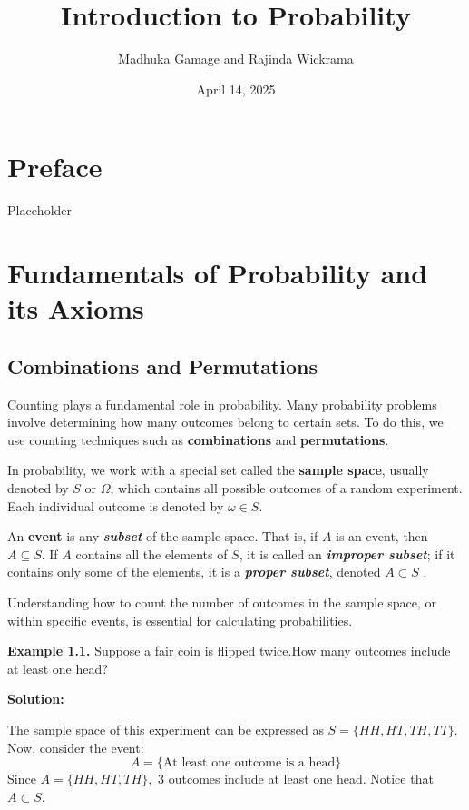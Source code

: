 \documentclass[
  12pt,
]{krantzNoCorner}
\title{Introduction to Probability}
\author{Madhuka Gamage and Rajinda Wickrama}
\date{April 14, 2025}
\begin{document}
\maketitle

{
\hypersetup{linkcolor=}
\setcounter{tocdepth}{2}
\tableofcontents
}
\hypertarget{preface}{%
\chapter*{Preface}\label{preface}}


Placeholder

\hypertarget{fundamentals-of-probability-and-its-axioms}{%
\chapter{Fundamentals of Probability and its Axioms}\label{fundamentals-of-probability-and-its-axioms}}

\hypertarget{combinations-and-permutations}{%
\section{Combinations and Permutations}\label{combinations-and-permutations}}

Counting plays a fundamental role in probability. Many probability problems involve determining how many outcomes belong to certain sets. To do this, we use counting techniques such as \textbf{combinations} and \textbf{permutations}.

In probability, we work with a special set called the \textbf{sample space}, usually denoted by \(S\) or \(\Omega\), which contains all possible outcomes of a random experiment. Each individual outcome is denoted by \(\omega \in S\).

An \textbf{event} is any \textbf{\emph{subset}} of the sample space. That is, if \(A\) is an event, then \(A \subseteq S\). If \(A\) contains all the elements of \(S\), it is called an \textbf{\emph{improper subset}}; if it contains only some of the elements, it is a \textbf{\emph{proper subset}}, denoted \(A \subset S\) .

Understanding how to count the number of outcomes in the sample space, or within specific events, is essential for calculating probabilities.

\textbf{Example 1.1.} Suppose a fair coin is flipped twice.How many outcomes include at least one head?

\textbf{Solution:}

The sample space of this experiment can be expressed as
\(S=\{HH,HT,TH,TT\}\). Now, consider the event:
\[A=\{\text{At least one outcome is a head}\}\]
Since \(A=\{HH,HT,TH\},\) 3 outcomes include at least one head. Notice that \(A\subset S\).
\end{document}
